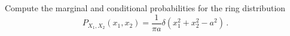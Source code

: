 

Compute the marginal and conditional probabilities for the ring distribution
\begin{equation*}
P_{X_1, X_2}(x_1, x_2) = \frac{1}{\pi a} \delta (x_1^2 + x_2^2 - a^2) \, .
\end{equation*}


